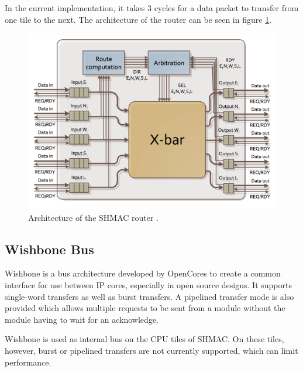In the current implementation, it takes 3 cycles for a data packet to transfer from one tile to the next. 
The architecture of the router can be seen in figure \ref{fig:shmac-router}.

\begin{figure}[htb]
    \centering
    \includegraphics[width=1.0\textwidth]{Figures/Heterogeneous/SHMACRouter}
    \caption{Architecture of the SHMAC router \cite{shmac-plan}.}
    \label{fig:shmac-router}
\end{figure}

\subsection{Wishbone Bus}

Wishbone is a bus architecture developed by OpenCores to create a common interface for use between IP cores, especially in
open source designs. It supports single-word transfers as well as burst transfers. A pipelined transfer mode is also provided
which allows multiple requests to be sent from a module without the module having to wait for an acknowledge.

Wishbone is used as internal bus on the CPU tiles of SHMAC. On these tiles, however, burst or pipelined transfers are
not currently supported, which can limit performance.

%


